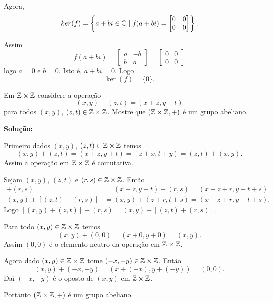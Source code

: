 \documentclass[12pt]{article}
\begin{document}
Agora,
\[
	ker(f) = \left\{a + bi \in \mathbb{C} \mid f(a + bi) = \begin{bmatrix}
		0 & 0\\
		0 & 0
	\end{bmatrix}\right\}.
\]

Assim
\[
	f(a + bi) = \begin{bmatrix}
		a & -b\\
		b & a
	\end{bmatrix} = \begin{bmatrix}
		0 & 0\\
		0 & 0
	\end{bmatrix}
\]
logo $a = 0$ e $b = 0$. Isto \'e, $a + bi = 0$. Logo 
\[
	\ker(f) = \{0\}.
\]

\vspace{1cm}

\questao Em $\mathbb{Z} \times\mathbb{Z}$ considere a opera\c{c}\~ao
\[
	(x, y) + (z, t) = (x + z, y + t)
\]
para todos $(x,y)$, $(z,t) \in \mathbb{Z}\times\mathbb{Z}$. Mostre que $(\mathbb{Z}\times\mathbb{Z}, +)$ \'e um grupo abeliano.

\noindent\textbf{Solu\c{c}\~ao:}

Primeiro dados $(x,y)$, $(z,t) \in \mathbb{Z}\times\mathbb{Z}$ temos
\[
	(x,y) + (z,t) = (x+z,y+t) = (z+x,t+y) = (z,t) + (x,y).
\]
Assim a opera\c{c}\~ao em $\mathbb{Z}\times\mathbb{Z}$ \'e comutativa.

Sejam $(x,y)$, $(z,t)$ e $(r,s) \in \mathbb{Z}\times\mathbb{Z}$. Ent\~ao
\begin{align*}
	[(x,y) + (z,t)] + (r,s) &= (x + z, y+t) + (r,s) = (x+z+r,y+t+s)\\
	(x,y) + [(z,t)+(r,s)] &= (x,y) + (z+r,t+s) = (x+z+r,y+t+s).
\end{align*}
Logo $[(x,y)+(z,t)] + (r,s) = (x,y) + [(z,t) + (r,s)]$.

Para todo $(x,y) \in \mathbb{Z}\times\mathbb{Z}$ temos
\[
	(x,y) + (0,0) = (x+0,y+0) = (x,y).
\]
Assim $(0,0)$ \'e o elemento neutro da opera\c{c}\~ao em $\mathbb{Z}\times\mathbb{Z}$.

Agora dado $(x,y) \in \mathbb{Z}\times\mathbb{Z}$ tome $(-x,-y) \in \mathbb{Z}\times\mathbb{Z}$. Ent\~ao
\[
	(x,y) + (-x,-y) = (x+(-x),y+(-y)) = (0,0).
\]
Da{\'\i} $(-x,-y)$ \'e o oposto de $(x,y)$ em $\mathbb{Z}\times\mathbb{Z}$.

Portanto $(\mathbb{Z}\times\mathbb{Z},+)$ \'e um grupo abeliano.
\end{document}
